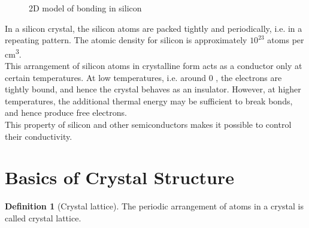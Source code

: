 \documentclass[titlepage, fleqn, a4paper, 12pt, twoside]{article}
\theoremstyle{definition}
\newtheorem{definition}{Definition}
\theoremstyle{theorem}
\let\Oldsection\section
\renewcommand{\section}{\FloatBarrier\Oldsection}
\begin{document}
\begin{figure}[h]
	\centering
	\caption{2D model of bonding in silicon}
\end{figure}

In a silicon crystal, the silicon atoms are packed tightly and periodically, i.e. in a repeating pattern.
The atomic density for silicon is approximately $10^{23}$ atoms per \si{\cubic\centi\metre}.\\
This arrangement of silicon atoms in crystalline form acts as a conductor only at certain temperatures.
At low temperatures, i.e. around 0 \kelvin, the electrons are tightly bound, and hence the crystal behaves as an insulator.
However, at higher temperatures, the additional thermal energy may be sufficient to break bonds, and hence produce free electrons.\\
This property of silicon and other semiconductors makes it possible to control their conductivity.

\section{Basics of Crystal Structure}

\begin{definition}[Crystal lattice]
	The periodic arrangement of atoms in a crystal is called crystal lattice.
\end{definition}
\end{document}
